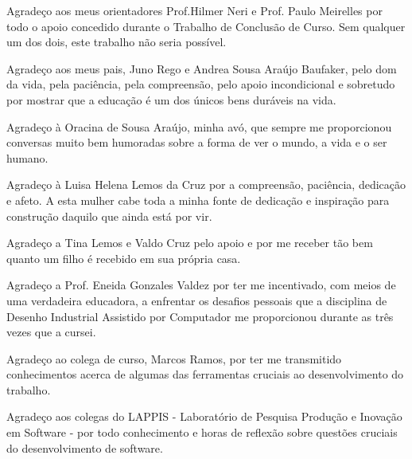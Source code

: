 \begin{agradecimentos}
Agradeço aos meus orientadores Prof.Hilmer Neri e Prof. Paulo Meirelles por 
todo o apoio concedido durante o Trabalho de Conclusão de Curso. 
Sem qualquer um dos dois, este trabalho não seria possível.

Agradeço aos meus pais, Juno Rego e Andrea Sousa Araújo Baufaker, pelo dom da 
vida, pela paciência, pela compreensão, pelo apoio incondicional e sobretudo 
por mostrar que a educação é um dos únicos bens duráveis na vida.

Agradeço à Oracina de Sousa Araújo, minha avó, que sempre me proporcionou 
conversas muito bem humoradas sobre a forma de ver o mundo, a vida e o ser 
humano.

Agradeço à Luisa Helena Lemos da Cruz por a compreensão, paciência, dedicação e
afeto. A esta mulher cabe toda a minha fonte de dedicação e inspiração para 
construção daquilo que ainda está por vir.

Agradeço a Tina Lemos e Valdo Cruz pelo apoio e por me receber tão bem quanto um 
filho é recebido em sua própria casa.

Agradeço a Prof. Eneida Gonzales Valdez por ter me incentivado, com meios de uma
verdadeira educadora, a enfrentar os desafios pessoais que a disciplina de 
Desenho Industrial Assistido por Computador me proporcionou durante as três 
vezes que a cursei.

Agradeço ao colega de curso, Marcos Ramos, por ter me transmitido conhecimentos 
acerca de algumas das ferramentas cruciais ao desenvolvimento do trabalho.

Agradeço aos colegas do LAPPIS - Laboratório de Pesquisa Produção e Inovação em 
Software - por todo conhecimento e horas de reflexão sobre questões cruciais do
desenvolvimento de software.

\end{agradecimentos}
